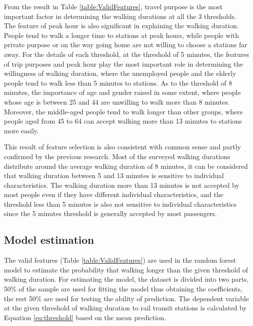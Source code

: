 \documentclass[Journal,letterpaper]{ascelike-new}
\begin{document}
%
From the result in Table \ref{table:ValidFeatures}, travel purpose is the most important factor in determining the walking durations at all the 3 thresholds. The feature of peak hour is also significant in explaining the walking duration. People tend to walk a longer time to stations at peak hours, while people with private purpose or on the way going home are not willing to choose a stations far away. For the details of each threshold, at the threshold of 5 minutes, the features of trip purposes and peak hour play the most important role in determining the willingness of walking duration, where the unemployed people and the elderly people tend to walk less than 5 minutes to stations. As to the threshold of 8 minutes, the importance of age and gender raised in some extent, where people whose age is between 25 and 44 are unwilling to walk more than 8 minutes. Moreover, the middle-aged people tend to walk longer than other groups, where people aged from 45 to 64 can accept walking more than 13 minutes to stations more easily. 

% 
This result of feature selection is also consistent with common sense and partly confirmed by the previous research. Most of the surveyed walking durations distribute around the average walking duration of 8 minutes, it can be considered that walking duration between 5 and 13 minutes is sensitive to individual characteristics. The walking duration more than 13 minutes is not accepted by most people even if they have different individual characteristics, and the threshold less than 5 minutes is also not sensitive to individual characteristics since the 5 minutes threshold is generally accepted by most passengers.

%
\subsection{Model estimation}
The valid features (Table \ref{table:ValidFeatures}) are used in the random forest model to estimate the probability that walking longer than the given threshold of walking duration. For estimating the model, the dataset is divided into two parts, 50\% of the sample are used for fitting the model thus obtaining the coefficients, the rest 50\% are used for testing the ability of prediction. The dependent variable at the given threshold of walking duration to rail transit stations is calculated by Equation \ref{eq:threshold} based on the mean prediction.
\end{document}

